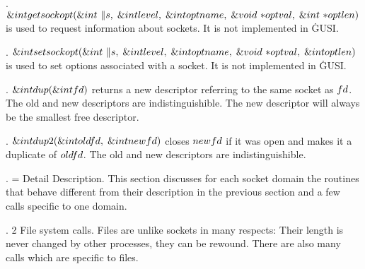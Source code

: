\fi

. \CD{}$\&{int}\ \\{getsockopt}(\&{int}\ \|s,\;\&{int}\ \\{level},\;\&{int}%
\ \\{optname},\;\&{void}\ {*}\\{optval},\;\&{int}\ {*}\\{optlen})$\DC{} is
used to request information about sockets. It is not implemented in \.{GUSI}.

\fi

. \CD{}$\&{int}\ \\{setsockopt}(\&{int}\ \|s,\;\&{int}\ \\{level},\;\&{int}%
\ \\{optname},\;\&{void}\ {*}\\{optval},\;\&{int}\ \\{optlen})$\DC{} is used
to set options associated with a socket. It is not implemented in \.{GUSI}.

\fi

. \CD{}$\&{int}\ \\{dup}(\&{int}\ \\{fd})$\DC{} returns a new descriptor
referring to the same socket as \CD{}$\\{fd}$\DC{}.
The old and new descriptors are indistinguishible. The new descriptor will
always
be the smallest free descriptor.

\fi

. \CD{}$\&{int}\ \\{dup2}(\&{int}\ \\{oldfd},\;\&{int}\ \\{newfd})$\DC{}
closes \CD{}$\\{newfd}$\DC{} if it was open and makes it
a duplicate of \CD{}$\\{oldfd}$\DC{}. The old and new descriptors are
indistinguishible.

\fi

. = Detail Description. This section discusses for each socket domain the
routines
that behave different from their description in the previous section and a few
calls
specific to one domain.

\fi

. 2 File system calls. Files are unlike sockets in many respects: Their
length is
never changed by other processes, they can be rewound. There are also many
calls which
are specific to files.

\fi

